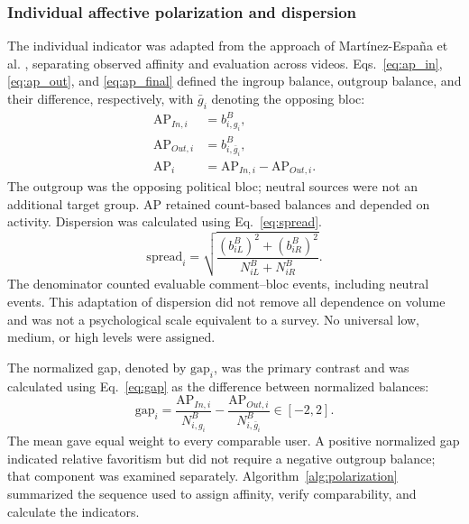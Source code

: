 \documentclass[conference, letterpaper]{IEEEtran}
\begin{document}
\subsubsection{Individual affective polarization and dispersion}
\label{subsubsec:ap_individual}
The individual indicator was adapted from the approach of Martínez-España et al. \cite{polariz}, separating observed affinity and evaluation across videos. Eqs.~\eqref{eq:ap_in}, \eqref{eq:ap_out}, and \eqref{eq:ap_final} defined the ingroup balance, outgroup balance, and their difference, respectively, with $\bar g_i$ denoting the opposing bloc:
\begin{align}
\mathrm{AP}_{In,i}&=b^B_{i,g_i},\label{eq:ap_in}\\
\mathrm{AP}_{Out,i}&=b^B_{i,\bar g_i},\label{eq:ap_out}\\
\mathrm{AP}_i&=\mathrm{AP}_{In,i}-\mathrm{AP}_{Out,i}.\label{eq:ap_final}
\end{align}
The outgroup was the opposing political bloc; neutral sources were not an additional target group. AP retained count-based balances and depended on activity. Dispersion was calculated using Eq.~\eqref{eq:spread}.
\begin{equation}
\mathrm{spread}_i=\sqrt{\frac{(b^B_{iL})^2+(b^B_{iR})^2}{N^B_{iL}+N^B_{iR}}}.
\label{eq:spread}
\end{equation}
The denominator counted evaluable comment--bloc events, including neutral events. This adaptation of dispersion \cite{wagner2021affective,polariz} did not remove all dependence on volume and was not a psychological scale equivalent to a survey. No universal low, medium, or high levels were assigned.

The normalized gap, denoted by $\mathrm{gap}_i$, was the primary contrast and was calculated using Eq.~\eqref{eq:gap} as the difference between normalized balances:
\begin{equation}
\mathrm{gap}_i=\frac{\mathrm{AP}_{In,i}}{N^B_{i,g_i}}-\frac{\mathrm{AP}_{Out,i}}{N^B_{i,\bar g_i}}\in[-2,2].
\label{eq:gap}
\end{equation}
The mean gave equal weight to every comparable user. A positive normalized gap indicated relative favoritism but did not require a negative outgroup balance; that component was examined separately. Algorithm~\ref{alg:polarization} summarized the sequence used to assign affinity, verify comparability, and calculate the indicators.
\end{document}
